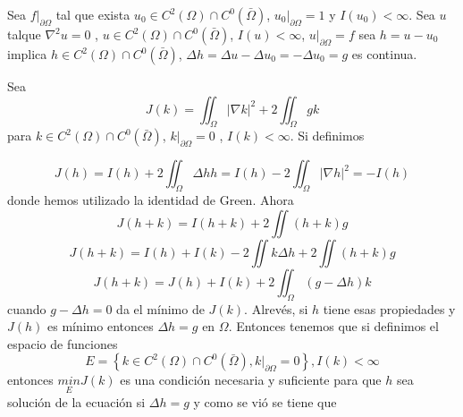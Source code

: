 \documentclass[a4paper,10pt]{book}
\begin{document}
Sea $f|_{\partial \Omega}$ tal que exista $u_0 \in C^2(\Omega) \cap  C^0(\bar{\Omega}) $, $u_0|_{\partial \Omega}=1$ y $I(u_0)< \infty$.
Sea $u$ talque $\nabla^2 u=0$ , $u\in C^2(\Omega)\cap C^0(\bar{\Omega})$, $I(u)<\infty$, $u|_{\partial \Omega}=f$ sea 
$h=u-u_0$ implica $h \in C^2(\Omega) \cap  C^0(\bar{\Omega})$, $\Delta h=\Delta u-\Delta u_0=-\Delta u_0=g$  es continua. 

Sea 
\[J(k)=\iint_\Omega| \nabla k|^2  + 2\iint_\Omega gk \]
para $k\in C^2 (\Omega)\cap C^0(\bar{\Omega}) $, $k|_{\partial \Omega}=0$ , $I(k)<\infty$. Si definimos

\[J(h)=I(h)+2 \iint_\Omega \Delta h h  = I(h) -2\iint_\Omega | \nabla h |^2 = -I(h)\]
donde hemos utilizado la identidad de Green. Ahora 
\[J(h+k)= I(h+k)+2\iint (h+k)g  \]
\[J(h+k)= I(h)+I(k) -2 \iint k \Delta h+2\iint  (h+k)g \]
\[J(h+k)=J(h) +I(k)+2 \iint_\Omega( g-\Delta h )k \]
cuando $g-\Delta h =0$ da el m\'inimo  de $J(k)$. Alrev\'es,  si $h$ tiene esas propiedades y $J(h)$ es
m\'inimo entonces $\Delta h=g$ en $\Omega$. Entonces tenemos que si definimos el espacio de funciones
\[E=\left\lbrace k\in C^2 (\Omega) \cap C^0(\bar{\Omega} ), k|_{\partial \Omega}=0 \right\rbrace, I(k)<\infty\]
entonces $  \underset{E}{min} J(k)$  es una condici\'on necesaria y suficiente para que $h$ 
sea soluci\'on de la ecuaci\'on si $\Delta h=g$ y como se vi\'o se tiene que
\end{document}
